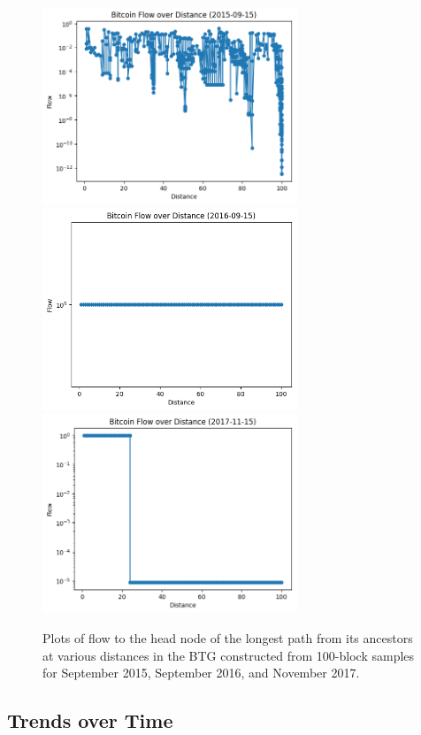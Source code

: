 \documentclass[letterpaper, 10 pt, conference]{ieeeconf}  %
\begin{document}
\begin{figure}
\centering
\includegraphics[width=3in]{Plots/Flow_distros/2015-09-15.png} \newline
\includegraphics[width=3in]{Plots/Flow_distros/2016-09-15.png} \newline
\includegraphics[width=3in]{Plots/Flow_distros/2017-11-15.png}
\caption{\label{distance-flow} Plots of flow to the head node of the longest path from its ancestors at various distances in the BTG constructed from 100-block samples for September 2015, September 2016, and November 2017.}
\end{figure}


\subsection{Trends over Time}
\end{document}
